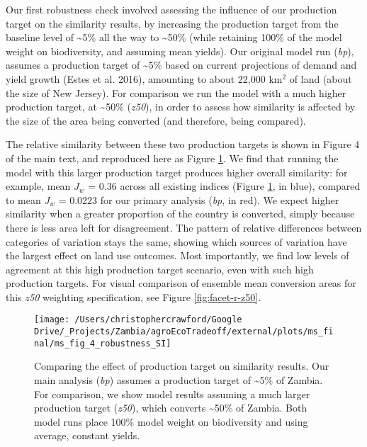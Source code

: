 \documentclass[
]{article}
\begin{document}
Our first robustness check involved assessing the influence of our production target on the similarity results, by increasing the production target from the baseline level of \textasciitilde5\% all the way to \textasciitilde50\% (while retaining 100\% of the model weight on biodiversity, and assuming mean yields). Our original model run (\emph{bp}), assumes a production target of \textasciitilde5\% based on current projections of demand and yield growth (Estes et al. 2016), amounting to about 22,000 km\(^2\) of land (about the size of New Jersey). For comparison we run the model with a much higher production target, at \textasciitilde50\% (\emph{z50}), in order to assess how similarity is affected by the size of the area being converted (and therefore, being compared).

The relative similarity between these two production targets is shown in Figure 4 of the main text, and reproduced here as Figure \ref{fig:z50-bp-comparison}. We find that running the model with this larger production target produces higher overall similarity: for example, mean \(J_w\) = 0.36 across all existing indices (Figure \ref{fig:z50-bp-comparison}, in blue), compared to mean \(J_w\) = 0.0223 for our primary analysis (\emph{bp}, in red). We expect higher similarity when a greater proportion of the country is converted, simply because there is less area left for disagreement. The pattern of relative differences between categories of variation stays the same, showing which sources of variation have the largest effect on land use outcomes. Most importantly, we find low levels of agreement at this high production target scenario, even with such high production targets. For visual comparison of ensemble mean conversion areas for this \emph{z50} weighting specification, see Figure \ref{fig:facet-r-z50}.



\begin{figure}
\texttt{[image: /Users/christophercrawford/Google Drive/\_Projects/Zambia/agroEcoTradeoff/external/plots/ms\_final/ms\_fig\_4\_robustness\_SI]} \caption{Comparing the effect of production target on similarity results. Our main analysis (\emph{bp}) assumes a production target of \textasciitilde5\% of Zambia. For comparison, we show model results assuming a much larger production target (\emph{z50}), which converts \textasciitilde50\% of Zambia. Both model runs place 100\% model weight on biodiversity and using average, constant yields.}\label{fig:z50-bp-comparison}
\end{figure}
\end{document}
